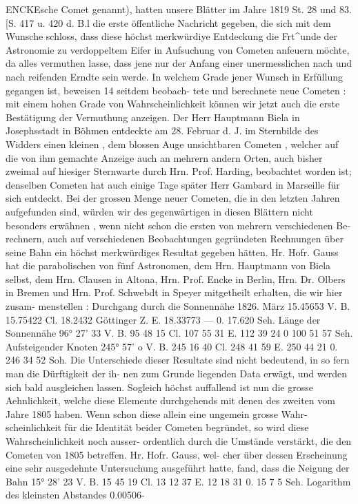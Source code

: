 \documentclass[10pt,a4paper]{article}
\begin{document}
ENCKEsche  Comet  genannt),  hatten  unsere  Blätter  im  Jahre  1819  St.  28  und  83.  [S.  417  u.  420  d.  B.l  die
erste  öffentliche  Nachricht  gegeben,  die  sich  mit  dem  Wunsche  schloss,  dass  diese  höchst  merkwürdiye
Entdeckung  die  Frt\textasciicircum{}unde  der  Astronomie  zu  verdoppeltem  Eifer  in  Aufsuchung  von  Cometen  anfeuern  möchte,
da  alles  vermuthen  lasse,  dass  jene  nur  der  Anfang  einer  unermesslichen  nach  und  nach  reifenden  Erndte
sein  werde.  In  welchem  Grade  jener  Wunsch  in  Erfüllung  gegangen  ist,  beweisen  14  seitdem  beobach-
tete und  berechnete  neue  Cometen :  mit  einem  hohen  Grade  von  Wahrscheinlichkeit  können  wir  jetzt
auch  die  erste  Bestätigung  der  Vermuthung  anzeigen.  Der  Herr  Hauptmann  Biela  in  Josephsstadt  in
Böhmen  entdeckte  am  28.  Februar  d.  J.  im  Sternbilde  des  Widders  einen  kleinen ,  dem  blossen  Auge
unsichtbaren  Cometen ,  welcher  auf  die  von  ihm  gemachte  Anzeige  auch  an  mehrern  andern  Orten,  auch
bisher  zweimal  auf  hiesiger  Sternwarte  durch  Hrn.  Prof.  Harding,  beobachtet  worden  ist;  denselben
Cometen  hat  auch  einige  Tage  später  Herr  Gambard  in  Marseille  für  sich  entdeckt.  Bei  der  grossen
Menge  neuer  Cometen,  die  in  den  letzten  Jahren  aufgefunden  sind,  würden  wir  des  gegenwärtigen  in
diesen  Blättern  nicht  besonders  erwähnen ,  wenn  nicht  schon  die  ersten  von  mehrern  verschiedenen  Be-
rechnern, auch  auf  verschiedenen  Beobachtungen  gegründeten  Rechnungen  über  seine  Bahn  ein  höchst
merkwürdiges  Resultat  gegeben  hätten.  Hr.  Hofr.  Gauss  hat  die  parabolischen  von  fünf  Astronomen,
dem  Hrn.  Hauptmann  von  Biela  selbst,  dem  Hrn.  Clausen  in  Altona,  Hrn.  Prof.  Encke  in  Berlin,  Hrn.
Dr.  Olbers  in  Bremen  und  Hrn.  Prof.  Schwebdt  in  Speyer  mitgetheilt  erhalten,  die  wir  hier  zusam-
menstellen :
Durchgang  durch  die  Sonnennähe
1826.  März    15.45653  V.  B.
15.75422  Cl.
18.2432    Göttinger  Z.  E.
18.33773         ---  0.
17.620      Seh.
Länge  der  Sonnennähe
96°  27'   33  V.  B.
95     48     15  Cl.
107    55    31  E.
112    39    24  0
100    51     57  Seh.
Aufsteigender  Knoten
245°  57'     o\glqq{}  V.  B.
245  16  40  Cl.
248  41  59  E.
250  44  21  0.
246  34  52  Soh.
Die  Unterschiede  dieser  Resultate  sind  nicht  bedeutend,  in  so  fern  man  die  Dürftigkeit  der  ih-
nen zum  Grunde  liegenden  Data  erwägt,  und  werden  sich  bald  ausgleichen  lassen.
Sogleich  höchst  auffallend  ist  nun  die  grosse  Aehnlichkeit,  welche  diese  Elemente  durchgehends
mit  denen  des  zweiten  vom  Jahre  1805  haben.  Wenn  schon  diese  allein  eine  ungemein  grosse  Wahr-
scheinlichkeit für  die  Identität  beider  Cometen  begründet,  so  wird  diese  Wahrscheinlichkeit  noch  ausser-
ordentlich durch  die  Umstände  verstärkt,  die  den  Cometen  von  1805  betreffen.  Hr.  Hofr.  Gauss,  wel-
cher über  dessen  Erscheinung   eine   sehr    ausgedehnte  Untersuchung   ausgeführt  hatte,   fand,   dass    die
Neigung
der  Bahn
15°  28'
23\glqq{}  V.  B.
15     45
19     Cl.
13     12
37     E.
12     18
31     0.
15       7
5     Seh.
Logarithm  des  kleinsten  Abstandes
0.00506-
\end{document}
